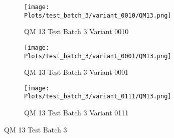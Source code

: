 \documentclass{DissertateFigs}
\begin{document}
\begin{figure}[t!]
\medskip

    \begin{subfigure}{0.47\textwidth}
    \texttt{[image: Plots/test\_batch\_3/variant\_0010/QM13.png]}
    \caption{QM 13 Test Batch 3 Variant 0010}
    \end{subfigure}
    \begin{subfigure}{0.47\textwidth}
    \texttt{[image: Plots/test\_batch\_3/variant\_0001/QM13.png]}
    \caption{QM 13 Test Batch 3 Variant 0001}
    \end{subfigure}

\medskip

    \begin{subfigure}{0.47\textwidth}
    \texttt{[image: Plots/test\_batch\_3/variant\_0111/QM13.png]}
    \caption{QM 13 Test Batch 3 Variant 0111}
    \end{subfigure}
\caption{QM 13 Test Batch 3}
    \end{figure}
\clearpage
\end{document}
